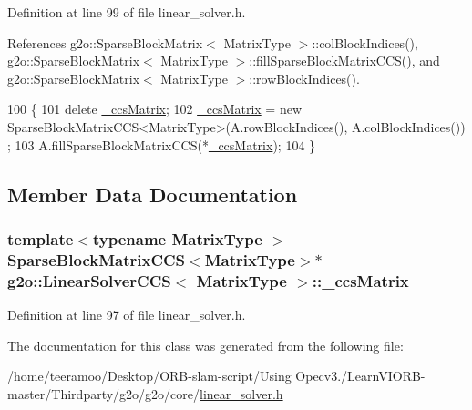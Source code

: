 Definition at line 99 of file linear\+\_\+solver.\+h.



References g2o\+::\+Sparse\+Block\+Matrix$<$ Matrix\+Type $>$\+::col\+Block\+Indices(), g2o\+::\+Sparse\+Block\+Matrix$<$ Matrix\+Type $>$\+::fill\+Sparse\+Block\+Matrix\+C\+C\+S(), and g2o\+::\+Sparse\+Block\+Matrix$<$ Matrix\+Type $>$\+::row\+Block\+Indices().


\begin{DoxyCode}
100     \{
101       \textcolor{keyword}{delete} \hyperlink{classg2o_1_1LinearSolverCCS_a07f0df9a6012d567e26a89063c53aa12}{\_ccsMatrix};
102       \hyperlink{classg2o_1_1LinearSolverCCS_a07f0df9a6012d567e26a89063c53aa12}{\_ccsMatrix} = \textcolor{keyword}{new} SparseBlockMatrixCCS<MatrixType>(A.rowBlockIndices(), A.colBlockIndices())
      ;
103       A.fillSparseBlockMatrixCCS(*\hyperlink{classg2o_1_1LinearSolverCCS_a07f0df9a6012d567e26a89063c53aa12}{\_ccsMatrix});
104     \}
\end{DoxyCode}


\subsection{Member Data Documentation}
\subsubsection[{\texorpdfstring{\+\_\+ccs\+Matrix}{_ccsMatrix}}]{\setlength{\rightskip}{0pt plus 5cm}template$<$typename Matrix\+Type $>$ {\bf Sparse\+Block\+Matrix\+C\+CS}$<$Matrix\+Type$>$$\ast$ {\bf g2o\+::\+Linear\+Solver\+C\+CS}$<$ Matrix\+Type $>$\+::\+\_\+ccs\+Matrix\hspace{0.3cm}{\ttfamily [protected]}}\hypertarget{classg2o_1_1LinearSolverCCS_a07f0df9a6012d567e26a89063c53aa12}{}\label{classg2o_1_1LinearSolverCCS_a07f0df9a6012d567e26a89063c53aa12}


Definition at line 97 of file linear\+\_\+solver.\+h.



The documentation for this class was generated from the following file\+:\begin{DoxyCompactItemize}
\item 
/home/teeramoo/\+Desktop/\+O\+R\+B-\/slam-\/script/\+Using Opecv3./\+Learn\+V\+I\+O\+R\+B-\/master/\+Thirdparty/g2o/g2o/core/\hyperlink{linear__solver_8h}{linear\+\_\+solver.\+h}\end{DoxyCompactItemize}
